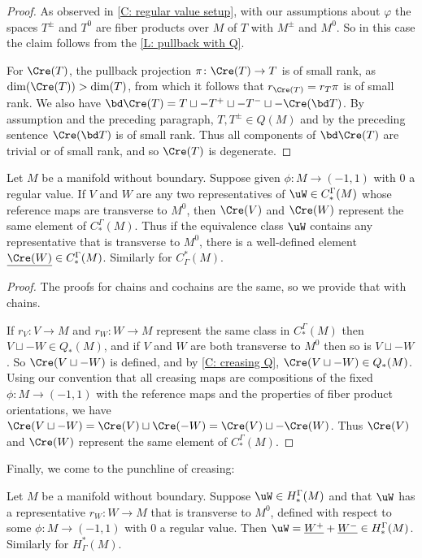 \begin{proof}
	As observed in \cref{C: regular value setup}, with our assumptions about $\varphi$ the spaces $T^\pm$ and $T^0$ are fiber products over $M$ of $T$ with $M^\pm$ and $M^0$.
	So in this case the claim follows from the \cref{L: pullback with Q}.

	For $\Cre(T)$, the pullback projection $\pi \colon \Cre(T) \to T$ is of small rank, as $\dim(\Cre(T))>\dim(T)$, from which it follows that $r_{\Cre(T)} = r_T\pi$ is of small rank.
	We also have $\bd \Cre(T) = T \sqcup - T^+ \sqcup -T^- \sqcup -\Cre(\bd T)$.
	By assumption and the preceding paragraph, $T, T^\pm \in Q(M)$ and by the preceding sentence $\Cre(\bd T)$ is of small rank.
	Thus all components of $\bd \Cre(T)$ are trivial or of small rank, and so $\Cre(T)$ is degenerate.
\end{proof}

\begin{proposition}
	Let $M$ be a manifold without boundary.
	Suppose given $\phi \colon M \to (-1,1)$ with $0$ a regular value.
	If $V$ and $W$ are any two representatives of $\uW \in C_*^\Gamma(M)$ whose reference maps are transverse to $M^0$, then $\Cre(V)$ and $\Cre(W)$ represent the same element of $C_*^\Gamma(M)$.
	Thus if the equivalence class $\uW$ contains any representative that is transverse to $M^0$, there is a well-defined element $\underline{\Cre(W)} \in C_*^\Gamma(M)$.
	Similarly for $C^*_\Gamma(M)$.
\end{proposition}

\begin{proof}
	The proofs for chains and cochains are the same, so we provide that with chains.

	If $r_V \colon V \to M$ and $r_W \colon W \to M$ represent the same class in $C_*^\Gamma(M)$ then $V \sqcup -W \in Q_*(M)$, and if $V$ and $W$ are both transverse to $M^0$ then so is $V \sqcup -W$.
	So $\Cre(V\sqcup-W)$ is defined, and by \cref{C: creasing Q}, $\Cre(V \sqcup -W) \in Q_*(M)$.
	Using our convention that all creasing maps are compositions of the fixed $\phi \colon M \to (-1,1)$ with the reference maps and the properties of fiber product orientations, we have $\Cre(V \sqcup -W) = \Cre(V) \sqcup \Cre(-W) = \Cre(V) \sqcup -\Cre(W)$.
	Thus $\Cre(V)$ and $\Cre(W)$ represent the same element of $C_*^\Gamma(M)$.
\end{proof}

Finally, we come to the punchline of creasing:

\begin{theorem}\label{T: cohomology creasing}
	Let $M$ be a manifold without boundary.
	Suppose $\uW \in H_*^\Gamma(M)$ and that $\uW$ has a representative $r_W \colon W \to M$ that is transverse to $M^0$, defined with respect to some $\phi \colon M \to (-1,1)$ with $0$ a regular value.
	Then $\uW = \underline{W^+} + \underline{W^-} \in H_*^\Gamma(M)$.
	Similarly for $H^*_\Gamma(M)$.
\end{theorem}

